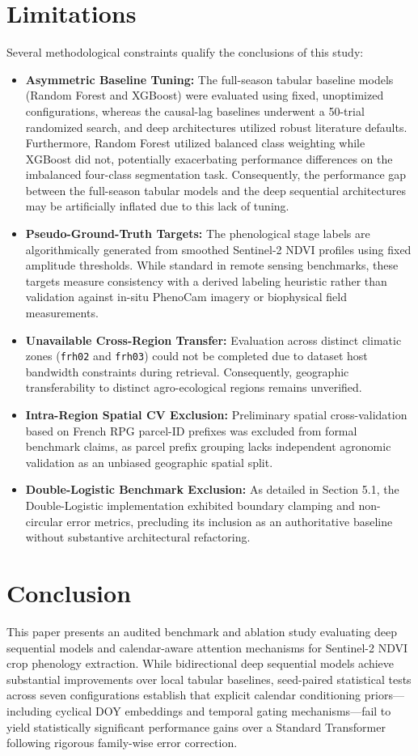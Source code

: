 \documentclass[runningheads]{llncs}
\begin{document}
\section{Limitations}
Several methodological constraints qualify the conclusions of this study:
\begin{itemize}
    \item \textbf{Asymmetric Baseline Tuning:} The full-season tabular baseline models (Random Forest and XGBoost) were evaluated using fixed, unoptimized configurations, whereas the causal-lag baselines underwent a 50-trial randomized search, and deep architectures utilized robust literature defaults. Furthermore, Random Forest utilized balanced class weighting while XGBoost did not, potentially exacerbating performance differences on the imbalanced four-class segmentation task. Consequently, the performance gap between the full-season tabular models and the deep sequential architectures may be artificially inflated due to this lack of tuning.
    \item \textbf{Pseudo-Ground-Truth Targets:} The phenological stage labels are algorithmically generated from smoothed Sentinel-2 NDVI profiles using fixed amplitude thresholds. While standard in remote sensing benchmarks, these targets measure consistency with a derived labeling heuristic rather than validation against in-situ PhenoCam imagery or biophysical field measurements.
    \item \textbf{Unavailable Cross-Region Transfer:} Evaluation across distinct climatic zones (\texttt{frh02} and \texttt{frh03}) could not be completed due to dataset host bandwidth constraints during retrieval. Consequently, geographic transferability to distinct agro-ecological regions remains unverified.
    \item \textbf{Intra-Region Spatial CV Exclusion:} Preliminary spatial cross-validation based on French RPG parcel-ID prefixes was excluded from formal benchmark claims, as parcel prefix grouping lacks independent agronomic validation as an unbiased geographic spatial split.
    \item \textbf{Double-Logistic Benchmark Exclusion:} As detailed in Section 5.1, the Double-Logistic implementation exhibited boundary clamping and non-circular error metrics, precluding its inclusion as an authoritative baseline without substantive architectural refactoring.
\end{itemize}

\section{Conclusion}
This paper presents an audited benchmark and ablation study evaluating deep sequential models and calendar-aware attention mechanisms for Sentinel-2 NDVI crop phenology extraction. While bidirectional deep sequential models achieve substantial improvements over local tabular baselines, seed-paired statistical tests across seven configurations establish that explicit calendar conditioning priors---including cyclical DOY embeddings and temporal gating mechanisms---fail to yield statistically significant performance gains over a Standard Transformer following rigorous family-wise error correction. 
\end{document}
